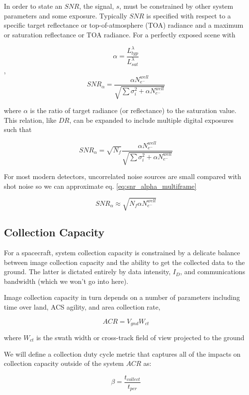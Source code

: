 \documentclass[10pt,journal]{IEEEtran}  %
\begin{document}
In order to state an $SNR$, the signal, $s$, must be constrained by other system parameters and some exposure.  Typically $SNR$ is specified with respect to a specific target reflectance or top-of-atmosphere (TOA) radiance and a maximum or saturation reflectance or TOA radiance.  For a perfectly exposed scene with

$$\alpha = \frac{L_{typ}^\lambda}{L_{sat}^\lambda}$$
,
$$SNR_{\alpha} = \frac{\alpha N_{e^-}^{well}}{\sqrt{\sum{\sigma_i^2} + \alpha N_{e^-}^{well}}}$$

where $\alpha$ is the ratio of target radiance (or reflectance) to the saturation value.  This relation, like $DR$, can be expanded to include multiple digital exposures such that

\begin{equation}
\label{eq:snr_alpha_multiframe}
SNR_{\alpha} = \sqrt{N_f}\frac{\alpha N_{e^-}^{well}}{\sqrt{\sum{\sigma_i^2} + \alpha N_{e^-}^{well}}}
\end{equation}

For most modern detectors, uncorrelated noise sources are small compared with shot noise so we can approximate eq. \ref{eq:snr_alpha_multiframe}

\begin{equation}
\label{eq:snr_alpha_multiframe_simp}
SNR_{\alpha} \approx \sqrt{N_f \alpha N_{e^-}^{well}}
\end{equation}

\subsection{Collection Capacity}
\label{sec:capacity}
For a spacecraft, system collection capacity is constrained by a delicate balance between image collection capacity and the ability to get the collected data to the ground.  The latter is dictated entirely by data intensity, $I_D$, and communications bandwidth (which we won't go into here).  

Image collection capacity in turn depends on a number of parameters including time over land, ACS agility, and area collection rate,

$$ACR = V_{gnd}W_{ct}$$

where $W_{ct}$ is the swath width or cross-track field of view projected to the ground

We will define a collection duty cycle metric that captures all of the impacts on collection capacity outside of the system $ACR$ as:

\begin{equation}
    \beta = \frac{t_{collect}}{t_{per}}
\end{equation} 
\end{document}
